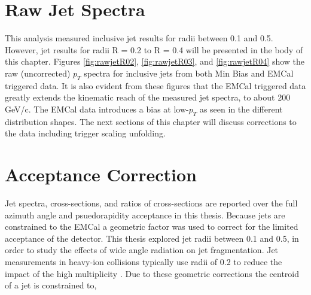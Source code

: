 \section{Raw Jet Spectra}

This analysis measured inclusive jet results for radii between 0.1 and 0.5.  However, jet results for radii R = 0.2 to R = 0.4 will be presented in the body of this chapter.  Figures \ref{fig:rawjetR02}, \ref{fig:rawjetR03}, and \ref{fig:rawjetR04} show the raw (uncorrected) $p_{T}$ spectra for inclusive jets from both Min Bias and EMCal triggered data.  It is also evident from these figures that the EMCal triggered data greatly extends the kinematic reach of the measured jet spectra, to about 200 GeV/c.  The EMCal data introduces a bias at low-$p_{T}$ as seen in the different distribution shapes.  The next sections of this chapter will discuss corrections to the data including trigger scaling unfolding. 



\section{Acceptance Correction}
Jet spectra, cross-sections, and ratios of cross-sections are reported over the full azimuth angle and psuedorapidity acceptance in this thesis.  Because jets are constrained to the EMCal a geometric factor was used to correct for the limited acceptance of the detector.  This thesis explored jet radii between 0.1 and 0.5, in order to study the effects of wide angle radiation on jet fragmentation.  Jet measurements in heavy-ion collisions typically use radii of 0.2 to reduce the impact of the high multiplicity .  Due to these geometric corrections the centroid of a jet is constrained to,

